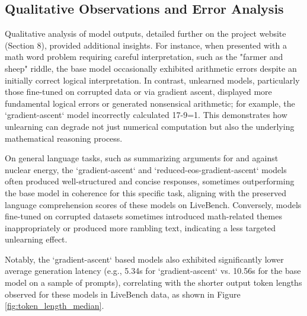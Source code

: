 \documentclass[10pt]{article}
\begin{document}
\subsection{Qualitative Observations and Error Analysis}
Qualitative analysis of model outputs, detailed further on the project website (Section 8), provided additional insights. For instance, when presented with a math word problem requiring careful interpretation, such as the "farmer and sheep" riddle, the base model occasionally exhibited arithmetic errors despite an initially correct logical interpretation. In contrast, unlearned models, particularly those fine-tuned on corrupted data or via gradient ascent, displayed more fundamental logical errors or generated nonsensical arithmetic; for example, the `gradient-ascent` model incorrectly calculated 17-9=1. This demonstrates how unlearning can degrade not just numerical computation but also the underlying mathematical reasoning process.

On general language tasks, such as summarizing arguments for and against nuclear energy, the `gradient-ascent` and `reduced-eos-gradient-ascent` models often produced well-structured and concise responses, sometimes outperforming the base model in coherence for this specific task, aligning with the preserved language comprehension scores of these models on LiveBench. Conversely, models fine-tuned on corrupted datasets sometimes introduced math-related themes inappropriately or produced more rambling text, indicating a less targeted unlearning effect.

Notably, the `gradient-ascent` based models also exhibited significantly lower average generation latency (e.g., 5.34s for `gradient-ascent` vs. 10.56s for the base model on a sample of prompts), correlating with the shorter output token lengths observed for these models in LiveBench data, as shown in Figure \ref{fig:token_length_median}.
\end{document}
